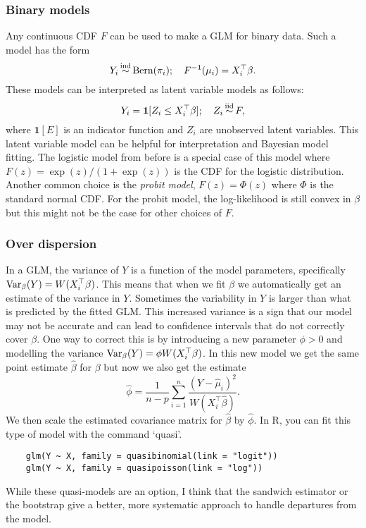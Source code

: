 \subsubsection*{Binary models} Any continuous CDF $F$ can be used to make a GLM for binary data. Such a model has the form
\[Y_i \simind \mathrm{Bern}(\pi_i); \quad F^{-1}(\mu_i) = X_i^\top \beta. \]
These models can be interpreted as latent variable models as follows:
\[Y_i = \mathbf{1}[Z_i \le X_i^\top \beta]; \quad Z_i \simiid F, \]
where $\mathbf{1}[E]$ is an indicator function and $Z_i$ are unobserved latent variables. This latent variable model can be helpful for interpretation and Bayesian model fitting. The logistic model from before is a special case of this model where $F(z) = \exp(z)/(1+\exp(z))$ is the CDF for the logistic distribution. Another common choice is the \emph{probit model}, $F(z) = \Phi(z)$ where $\Phi$ is the standard normal CDF. For the probit model, the log-likelihood is still convex in $\beta$ but this might not be the case for other choices of $F$.

\subsubsection*{Over dispersion} In a GLM, the variance of $Y$ is a function of the model parameters, specifically $\mathrm{Var}_\beta(Y) = W(X_i^\top \beta)$. This means that when we fit $\beta$ we automatically get an estimate of the variance in $Y$. Sometimes the variability in $Y$ is larger than what is predicted by the fitted GLM. This increased variance is a sign that our model may not be accurate and can lead to confidence intervals that do not correctly cover $\beta$. One way to correct this is by introducing a new parameter $\phi >0$ and modelling the variance $\mathrm{Var}_\beta(Y) = \phi W(X_i^\top \beta)$. In this new model we get the same  point estimate $\hat{\beta}$ for $\beta$ but now we also get the estimate
\[\hat{\phi} = \frac{1}{n-p} \sum_{i=1}^n \frac{(Y-\hat{\mu}_i)^2}{W(X_i^\top \hat{\beta})}. \]
We then scale the estimated covariance matrix for $\hat{\beta}$ by $\hat{\phi}$. In R, you can fit this type of model with the command `quasi'.

\begin{lstlisting}
    glm(Y ~ X, family = quasibinomial(link = "logit"))
    glm(Y ~ X, family = quasipoisson(link = "log"))
\end{lstlisting}

While these quasi-models are an option, I think that the sandwich estimator or the bootstrap give a better, more systematic approach to handle departures from the model. 